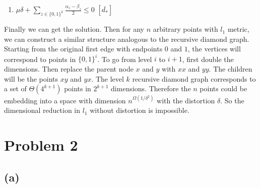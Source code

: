 \documentclass[twoside,11pt]{homework}
\begin{document}
\begin{enumerate}
\begin{center}
\begin{algorithm}[H]
\begin{enumerate}
      \item $\mu\delta + \sum\limits_{z \in \{0,1\}^{k}}\frac{\alpha_{z}-\beta_{z}}{2} \leq 0$   $[\overline{d_{*}}]$
    \end{enumerate}
    \end{algorithm}
    \end{center}
    Finally we can get the solution. Then for any $n$ arbitrary points with $l_{1}$ metric, we can construct a similar structure analogous to the recursive diamond graph. Starting from the original first edge with endpoints $0$ and $1$, the vertices will correspond to points in $\{0,1\}^{i}$. To go from level $i$ to $i+1$, first double the dimensions. Then replace the parent node $x$ and $y$ with $xx$ and $yy$. The children will be the points $xy$ and $yx$. The level $k$ recursive diamond graph corresponds to a set of $\Theta(4^{k+1})$ points in $2^{k+1}$ dimensions. Therefore the $n$ points could be embedding into a space with dimension $n^{\Omega(1/\delta^{2})}$ with the distortion $\delta$. So the dimensional reduction in $l_{1}$ without distortion is impossible.  

\end{enumerate}

\section*{Problem 2}
\subsection*{(a)}
\end{document}
